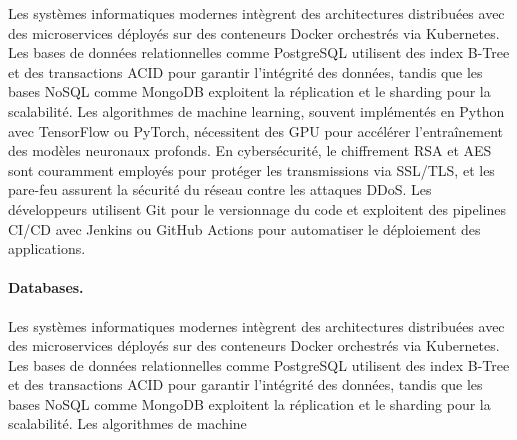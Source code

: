 Les systèmes informatiques modernes intègrent des architectures distribuées avec des microservices déployés sur des conteneurs Docker orchestrés via Kubernetes. Les bases de données relationnelles comme PostgreSQL utilisent des index B-Tree et des transactions ACID pour garantir l'intégrité des données, tandis que les bases NoSQL comme MongoDB exploitent la réplication et le sharding pour la scalabilité. Les algorithmes de machine learning, souvent implémentés en Python avec TensorFlow ou PyTorch, nécessitent des GPU pour accélérer l'entraînement des modèles neuronaux profonds. En cybersécurité, le chiffrement RSA et AES sont couramment employés pour protéger les transmissions via SSL/TLS, et les pare-feu assurent la sécurité du réseau contre les attaques DDoS. Les développeurs utilisent Git pour le versionnage du code et exploitent des pipelines CI/CD avec Jenkins ou GitHub Actions pour automatiser le déploiement des applications.

\paragraph{Databases.}
\label{par:eval-database}
Les systèmes informatiques modernes intègrent des architectures distribuées avec des microservices déployés sur des conteneurs Docker orchestrés via Kubernetes. Les bases de données relationnelles comme PostgreSQL utilisent des index B-Tree et des transactions ACID pour garantir l'intégrité des données, tandis que les bases NoSQL comme MongoDB exploitent la réplication et le sharding pour la scalabilité. Les algorithmes de machine 




